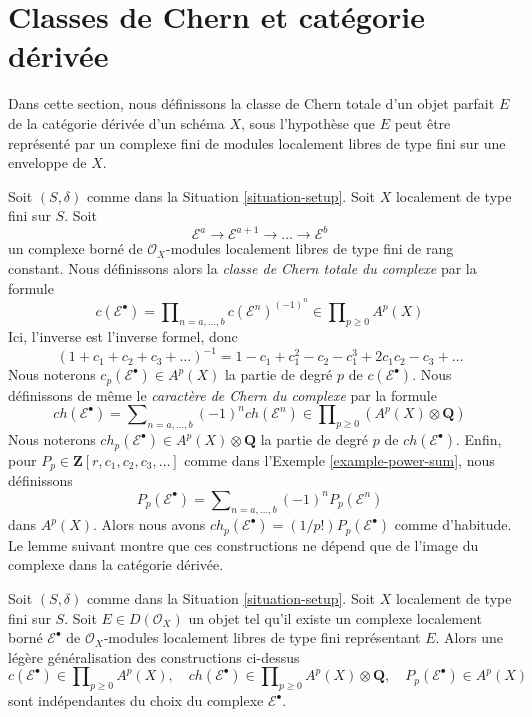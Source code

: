 \section{Classes de Chern et catégorie dérivée}
\label{section-pre-derived}

\noindent
Dans cette section, nous définissons la classe de Chern totale d'un objet parfait $E$
de la catégorie dérivée d'un schéma $X$, sous l'hypothèse que $E$
peut être représenté par un complexe fini de modules localement libres de type fini
sur une enveloppe de $X$.

\medskip\noindent
Soit $(S, \delta)$ comme dans la Situation \ref{situation-setup}.
Soit $X$ localement de type fini sur $S$. Soit
$$
\mathcal{E}^a \to \mathcal{E}^{a + 1} \to \ldots \to \mathcal{E}^b
$$
un complexe borné de $\mathcal{O}_X$-modules localement libres de type fini
de rang constant.
Nous définissons alors la {\it classe de Chern totale du complexe} par la formule
$$
c(\mathcal{E}^\bullet) = \prod\nolimits_{n = a, \ldots, b}
c(\mathcal{E}^n)^{(-1)^n} \in \prod\nolimits_{p \geq 0} A^p(X)
$$
Ici, l'inverse est l'inverse formel, donc
$$
(1 + c_1 + c_2 + c_3 + \ldots)^{-1} =
1 - c_1 + c_1^2 - c_2 - c_1^3 + 2c_1 c_2 - c_3 + \ldots
$$
Nous noterons $c_p(\mathcal{E}^\bullet) \in A^p(X)$
la partie de degré $p$ de $c(\mathcal{E}^\bullet)$.
Nous définissons de même le {\it caractère de Chern du complexe} par
la formule
$$
ch(\mathcal{E}^\bullet) = \sum\nolimits_{n = a, \ldots, b}
(-1)^n ch(\mathcal{E}^n) \in
\prod\nolimits_{p \geq 0} (A^p(X) \otimes \mathbf{Q})
$$
Nous noterons $ch_p(\mathcal{E}^\bullet) \in A^p(X) \otimes \mathbf{Q}$
la partie de degré $p$ de $ch(\mathcal{E}^\bullet)$.
Enfin, pour $P_p \in \mathbf{Z}[r, c_1, c_2, c_3, \ldots]$
comme dans l'Exemple \ref{example-power-sum}, nous définissons
$$
P_p(\mathcal{E}^\bullet) = \sum\nolimits_{n = a, \ldots, b}
(-1)^n P_p(\mathcal{E}^n)
$$
dans $A^p(X)$. Alors nous avons
$ch_p(\mathcal{E}^\bullet) = (1/p!)P_p(\mathcal{E}^\bullet)$
comme d'habitude. Le lemme suivant montre que ces constructions ne dépend
que de l'image du complexe dans la catégorie dérivée.

\begin{lemma}
\label{lemma-pre-derived-chern-class}
Soit $(S, \delta)$ comme dans la Situation \ref{situation-setup}.
Soit $X$ localement de type fini sur $S$. Soit $E \in D(\mathcal{O}_X)$
un objet tel qu'il existe un complexe localement borné
$\mathcal{E}^\bullet$ de $\mathcal{O}_X$-modules localement libres de type fini
représentant $E$. Alors une légère généralisation des constructions ci-dessus
$$
c(\mathcal{E}^\bullet) \in \prod\nolimits_{p \geq 0} A^p(X),\quad
ch(\mathcal{E}^\bullet) \in
\prod\nolimits_{p \geq 0} A^p(X) \otimes \mathbf{Q},\quad
P_p(\mathcal{E}^\bullet) \in A^p(X)
$$
sont indépendantes du choix du complexe $\mathcal{E}^\bullet$.
\end{lemma}


